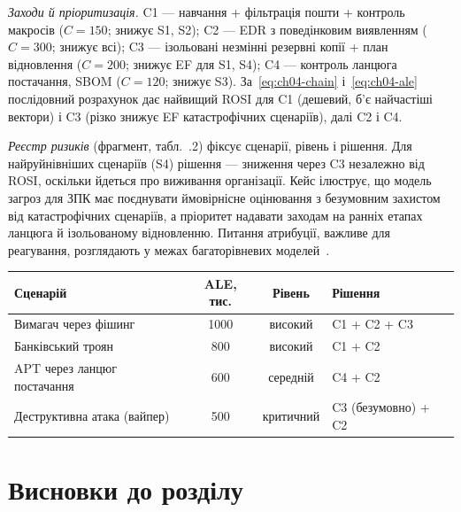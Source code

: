 \emph{Заходи й пріоритизація.} C1 --- навчання + фільтрація пошти + контроль макросів ($C=150$; знижує S1, S2); C2 --- EDR з поведінковим виявленням ($C=300$; знижує всі); C3 --- ізольовані незмінні резервні копії + план відновлення ($C=200$; знижує EF для S1, S4); C4 --- контроль ланцюга постачання, SBOM ($C=120$; знижує S3). За~\eqref{eq:ch04-chain} і~\eqref{eq:ch04-ale} послідовний розрахунок дає найвищий ROSI для C1 (дешевий, б'є найчастіші вектори) і C3 (різко знижує EF катастрофічних сценаріїв), далі C2 і C4.

\emph{Реєстр ризиків} (фрагмент, табл.~\thechapter.2) фіксує сценарії, рівень і рішення. Для найруйнівніших сценаріїв (S4) рішення --- зниження через C3 незалежно від ROSI, оскільки йдеться про виживання організації. Кейс ілюструє, що модель загроз для ЗПК має поєднувати ймовірнісне оцінювання з безумовним захистом від катастрофічних сценаріїв, а пріоритет надавати заходам на ранніх етапах ланцюга й ізольованому відновленню. Питання атрибуції, важливе для реагування, розглядають у межах багаторівневих моделей~\cite{ch04:lungol}.


\begin{center}\footnotesize
\begin{tabularx}{\linewidth}{Y c c L{30mm}}
\toprule
Сценарій & ALE, тис. & Рівень & Рішення \\
\midrule
Вимагач через фішинг & 1000 & високий & C1 + C2 + C3 \\
Банківський троян & 800 & високий & C1 + C2 \\
APT через ланцюг постачання & 600 & середній & C4 + C2 \\
Деструктивна атака (вайпер) & 500 & критичний & C3 (безумовно) + C2 \\
\bottomrule
\end{tabularx}
\end{center}

\section*{Висновки до розділу}

